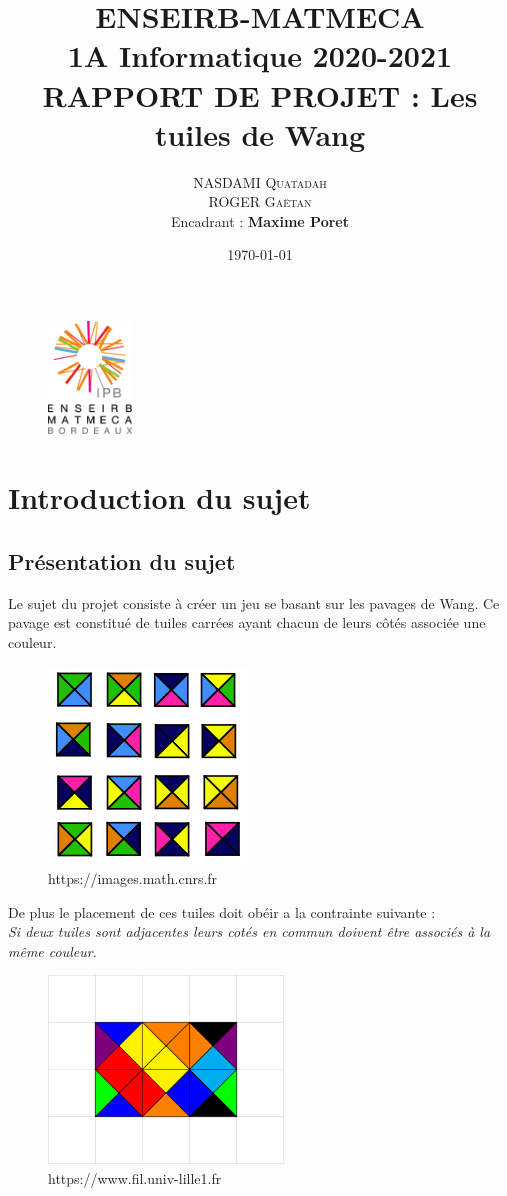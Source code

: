 \documentclass[12pt,a4paper]{extarticle}
\title{\Huge{\textbf{ENSEIRB-MATMECA}\\\Huge{\textbf{1A Informatique 2020-2021}}} \newline \newline \newline \newline \newline \newline \textbf{\Huge{RAPPORT DE PROJET  :} \newline \centering Les tuiles de Wang}}
\author{\textsc{NASDAMI Quatadah} \\ \textsc{ROGER Ga\"etan} \\Encadrant : \textbf{Maxime Poret}}
\date{\today}
\begin{document}
\begin{figure}[t]
    \centering
    \includegraphics[height=3cm]{img/logo}
\end{figure}
    \maketitle
    \newpage
    \tableofcontents
    \newpage
    
 
    \section{{Introduction du sujet}}
    \subsection{Pr\'esentation du sujet}
    Le sujet du projet consiste \`a cr\'eer un jeu se basant sur les pavages de Wang. Ce pavage est constitu\'e de tuiles carr\'ees
    ayant chacun de leurs c\^ot\'es associ\'ee une couleur.
    \begin{figure}[h!]
        \centering
        \includegraphics{img/tuile}
        \caption{https://images.math.cnrs.fr}
    \end{figure}
    
    De plus le placement de ces tuiles doit ob\'eir a la contrainte suivante : \\ \textit{Si deux tuiles sont adjacentes leurs cot\'es en commun doivent \^etre associ\'es \`a la m\^eme couleur}.
    \begin{figure}[h!]
        \centering
        \includegraphics[height=5cm]{img/tuile2}
        \caption{https://www.fil.univ-lille1.fr}
        \label{Wang}
    \end{figure}
\end{document}
